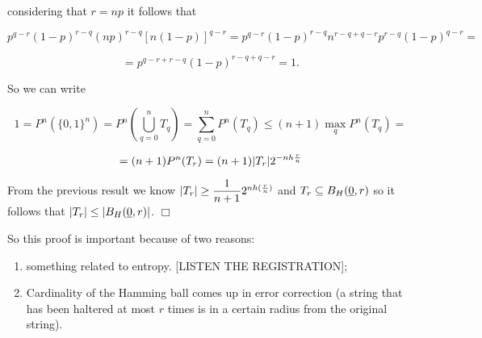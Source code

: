 considering that $r = np$ it follows that

\[p^{q-r}(1-p)^{r-q} (np)^{r-q}[n(1-p)]^{q-r}=p^{q-r}(1-p)^{r-q}n^{r-q+q-r}p^{r-q}(1-p)^{q-r} = \]

\[ = p^{q-r + r-q}(1-p)^{r-q+q-r} = 1.\]

So we can write

\[1 = P^n(\{0,1\}^n) = P^n\left(\bigcup_{q=0}^nT_q\right) = \sum_{q=0}^nP^n(T_q)\leq(n+1) \max_qP^n(T_q) = \]

\[=(n+1)P^n(T_r) = (n + 1)|T_r|2^{-nh\frac{r}{n}}\]
	
From the previous result we know $|T_r| \geq \dfrac{1}{n+1}2^{nh(\frac{r}{n})}$ and $T_r \subseteq B_H(\underline{0}, r)$ so it follows that $|T_r| \leq |B_H(\underline{0}, r)|$. \hfill $\Box$

So this proof is important because of two reasons:

\begin{enumerate}
	\item something related to entropy. [LISTEN THE REGISTRATION];
	\item Cardinality of the Hamming ball comes up in error correction (a string that has been haltered at most $r$ times is in a certain radius from the original string).
\end{enumerate}